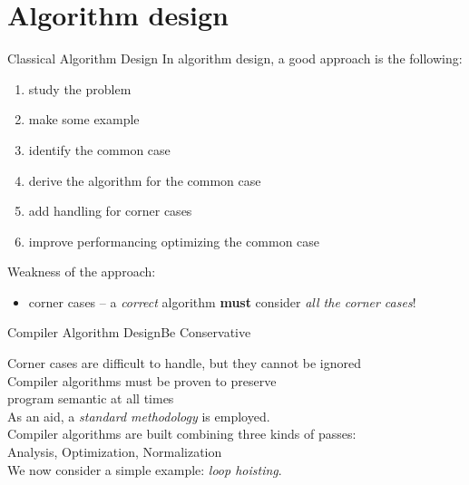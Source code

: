 
\section{Algorithm design}


\begin{frame}{Classical Algorithm Design}
In algorithm design, a good approach is the following:
\begin{enumerate}
\item study the problem
\item make some example
\item identify the \alert{common case}
\item derive the algorithm for the common case
\item add handling for \alert{corner cases}
\item improve performancing \alert{optimizing the common case}
\end{enumerate}

\vfill
Weakness of the approach:
\begin{itemize}
\item \alert{corner cases} -- a \emph{correct} algorithm \textbf{must} consider \emph{all the corner cases}!
\end{itemize}
\end{frame}


\begin{frame}{Compiler Algorithm Design}{Be Conservative}
\begin{center}
Corner cases are difficult to handle, but they cannot be ignored\\
\smallskip
{\small Compiler algorithms must be \alert{proven} to preserve\\
program semantic \alert{at all times}}\\
\bigskip
As an aid, a \emph{standard methodology} is employed.\\
\bigskip
Compiler algorithms are built combining \alert{three} kinds of passes:\\
\medskip
Analysis, Optimization, Normalization\\
\bigskip
\pause
We now consider a simple example: \emph{loop hoisting}.
\end{center}
\end{frame}


